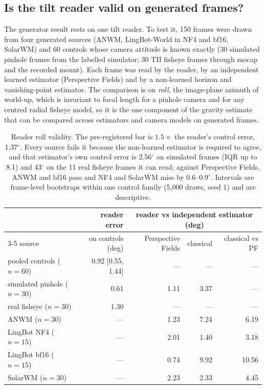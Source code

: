 
\subsection{Is the tilt reader valid on generated frames?}
\label{sec:h03-reader-validity}

The generator result rests on one tilt reader.  To test it, 150 frames were drawn from four
generated sources (ANWM, LingBot-World in NF4 and bf16, SolarWM) and 60 controls whose camera
attitude is known exactly (30 simulated pinhole frames from the labelled simulator; 30 TII
fisheye frames through mocap and the recorded mount).  Each frame was read by the reader, by
an independent learned estimator (Perspective Fields) and by a non-learned horizon and
vanishing-point estimator.
The comparison is on \emph{roll}, the image-plane azimuth of world-up, which is invariant to
focal length for a pinhole camera and for any centred radial fisheye model, so it is the one
component of the gravity estimate that can be compared across estimators and camera models on
generated frames.

\begin{table}[t]
\footnotesize
\begin{tabular}{lrrrr}
\toprule
 & reader error & \multicolumn{3}{c}{reader vs independent estimator (deg)} \\
\cmidrule(lr){3-5}
source & on controls (deg) & Perspective Fields & classical & classical vs PF \\
\midrule
pooled controls ($n{=}60$) & 0.92 [0.55, 1.44] & --- & --- & --- \\
\quad simulated pinhole ($n{=}30$) & 0.61 & 1.11 & 3.37 & --- \\
\quad real fisheye ($n{=}30$) & 1.30 & --- & --- & --- \\
\midrule
ANWM ($n{=}30$) & --- & 1.23 & 7.24 & 6.19 \\
LingBot NF4 ($n{=}15$) & --- & 2.01 & 1.40 & 3.18 \\
LingBot bf16 ($n{=}15$) & --- & 0.74 & 9.92 & 10.56 \\
SolarWM ($n{=}30$) & --- & 2.23 & 2.33 & 4.45 \\
\bottomrule
\end{tabular}
\caption{Reader roll validity.  The pre-registered bar is $1.5\times$ the reader's control
error, 1.37$^\circ$.  Every source fails it because the non-learned estimator is required to
agree, and that estimator's own control error is 2.56$^\circ$ on simulated frames (IQR up to
8.1) and 43$^\circ$ on the 11 real fisheye frames it can read; against Perspective Fields,
ANWM and bf16 pass and NF4 and SolarWM miss by 0.6--0.9$^\circ$.  Intervals are frame-level
bootstraps within one control family (5,000 draws, seed 1) and are descriptive.}
\label{tab:h03-reader-validity}
\end{table}

